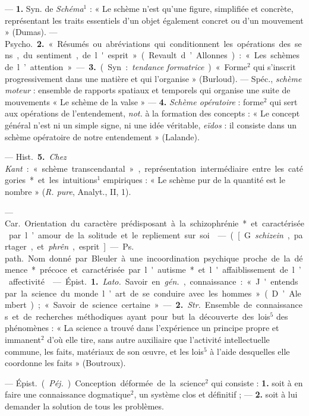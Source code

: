 \begin{itemize}[leftmargin=1cm, label=, itemsep=1pt]
 — {\bf 1.} Syn. de {\it Schéma}$^1$ : « Le schème n’est qu’une
figure, simplifiée et concrète, représentant les traits essentiels d’un objet
également concret ou d’un mouvement » (Dumas). — \si{Psycho.} {\bf 2.}
« Résumés ou abréviations qui conditionnent les opérations des sens, du
sentiment, de l'esprit » (Revault d’Allonnes) : « Les schèmes de
l’attention ». — {\bf 3.} (Syn. : {\it tendance formatrice}). « Forme$^2$
qui s’inscrit progressivement dans une matière et qui l’organise »
(Burloud). — Spéc., {\it schème moteur} : ensemble de rapports spatiaux et
temporels qui organise une suite de mouvements « Le schème de la valse » —
{\bf 4.} {\it Schème opératoire} : forme$^2$ qui sert aux opérations de
l’entendement, {\it not.} à la formation des concepts : « Le concept général
n’est ni un simple signe, ni une idée véritable,
{\it eïdos} : il consiste dans un schème opératoire de notre
entendement » (Lalande).

— \si{Hist.} {\bf 5.} {\it Chez Kant} : « schème transcendantal »,
représentation intermédiaire entre les catégories* et les intuitions$^1$
empiriques : « Le schème pur de la quantité est le nombre » ({\it R. pure},
Analyt., II, 1).

 — \si{Car.} Orientation du caractère prédisposant à la schizophrénie* et caractérisée par l’amour de la solitude et le repliement sur soi.

 — ([G. {\it schizein}, partager, et {\it phrên},
esprit] — \si{Ps. path.} Nom donné par Bleuler à une incoordination
psychique proche de la démence* précoce et caractérisée par l'autisme* et
l'affaiblissement de l’affectivité.

 — \si{Épist.} {\bf 1.} {\it Lato.} Savoir en {\it gén.},
connaissance : « J'entends par la science du monde l’art de se conduire avec
les hommes » (D’Alembert) ; « Savoir de science certaine... ». — {\bf 2.}
{\it Str.} Ensemble de connaissances et de recherches méthodiques ayant pour
but la découverte des lois$^5$ des phénomènes : « La science a trouvé dans
l’expérience un principe propre et immanent$^2$ d’où elle tire, sans autre
auxiliaire que l'activité intellectuelle commune, les faits, matériaux de son
œuvre, et les lois$^5$ à l'aide desquelles elle coordonne les
faits » (Boutroux).

 — \si{Épist.} ({\it Péj.}) Conception déformée de la
science$^2$ qui consiste : {\bf 1.} soit à en faire une connaissance
dogmatique$^2$, un système clos et définitif ; — {\bf 2.} soit à lui
demander la solution de tous les problèmes.


\end{itemize}
